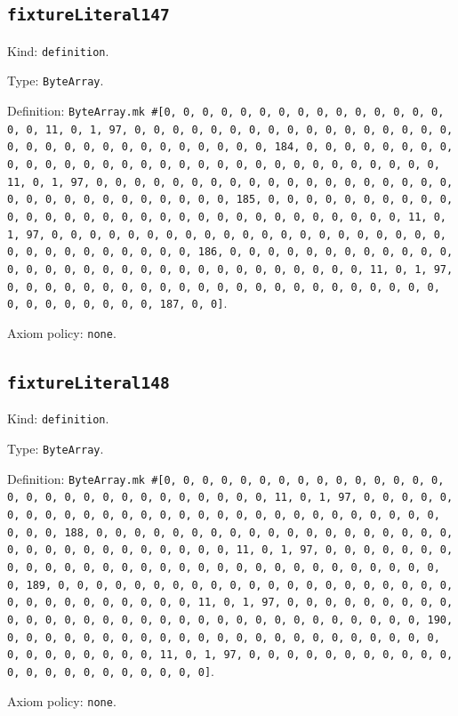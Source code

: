 \documentclass[11pt]{article}
\begin{document}
\subsection*{\texttt{fixtureLiteral147}}
\noindent Kind: \texttt{definition}.\par
\noindent Type: \texttt{ByteArray}.\par
\noindent Definition: \texttt{ByteArray.mk \#[0, 0, 0, 0, 0, 0, 0, 0, 0, 0, 0, 0, 0, 0, 0, 0, 0, 11, 0, 1, 97, 0, 0, 0, 0, 0, 0, 0, 0, 0, 0, 0, 0, 0, 0, 0, 0, 0, 0, 0, 0, 0, 0, 0, 0, 0, 0, 0, 0, 0, 0, 0, 184, 0, 0, 0, 0, 0, 0, 0, 0, 0, 0, 0, 0, 0, 0, 0, 0, 0, 0, 0, 0, 0, 0, 0, 0, 0, 0, 0, 0, 0, 0, 0, 11, 0, 1, 97, 0, 0, 0, 0, 0, 0, 0, 0, 0, 0, 0, 0, 0, 0, 0, 0, 0, 0, 0, 0, 0, 0, 0, 0, 0, 0, 0, 0, 0, 0, 0, 185, 0, 0, 0, 0, 0, 0, 0, 0, 0, 0, 0, 0, 0, 0, 0, 0, 0, 0, 0, 0, 0, 0, 0, 0, 0, 0, 0, 0, 0, 0, 0, 11, 0, 1, 97, 0, 0, 0, 0, 0, 0, 0, 0, 0, 0, 0, 0, 0, 0, 0, 0, 0, 0, 0, 0, 0, 0, 0, 0, 0, 0, 0, 0, 0, 0, 0, 186, 0, 0, 0, 0, 0, 0, 0, 0, 0, 0, 0, 0, 0, 0, 0, 0, 0, 0, 0, 0, 0, 0, 0, 0, 0, 0, 0, 0, 0, 0, 0, 11, 0, 1, 97, 0, 0, 0, 0, 0, 0, 0, 0, 0, 0, 0, 0, 0, 0, 0, 0, 0, 0, 0, 0, 0, 0, 0, 0, 0, 0, 0, 0, 0, 0, 0, 187, 0, 0]}.\par
\noindent Axiom policy: \texttt{none}.\par
\subsection*{\texttt{fixtureLiteral148}}
\noindent Kind: \texttt{definition}.\par
\noindent Type: \texttt{ByteArray}.\par
\noindent Definition: \texttt{ByteArray.mk \#[0, 0, 0, 0, 0, 0, 0, 0, 0, 0, 0, 0, 0, 0, 0, 0, 0, 0, 0, 0, 0, 0, 0, 0, 0, 0, 0, 0, 0, 11, 0, 1, 97, 0, 0, 0, 0, 0, 0, 0, 0, 0, 0, 0, 0, 0, 0, 0, 0, 0, 0, 0, 0, 0, 0, 0, 0, 0, 0, 0, 0, 0, 0, 0, 188, 0, 0, 0, 0, 0, 0, 0, 0, 0, 0, 0, 0, 0, 0, 0, 0, 0, 0, 0, 0, 0, 0, 0, 0, 0, 0, 0, 0, 0, 0, 0, 11, 0, 1, 97, 0, 0, 0, 0, 0, 0, 0, 0, 0, 0, 0, 0, 0, 0, 0, 0, 0, 0, 0, 0, 0, 0, 0, 0, 0, 0, 0, 0, 0, 0, 0, 189, 0, 0, 0, 0, 0, 0, 0, 0, 0, 0, 0, 0, 0, 0, 0, 0, 0, 0, 0, 0, 0, 0, 0, 0, 0, 0, 0, 0, 0, 0, 0, 11, 0, 1, 97, 0, 0, 0, 0, 0, 0, 0, 0, 0, 0, 0, 0, 0, 0, 0, 0, 0, 0, 0, 0, 0, 0, 0, 0, 0, 0, 0, 0, 0, 0, 0, 190, 0, 0, 0, 0, 0, 0, 0, 0, 0, 0, 0, 0, 0, 0, 0, 0, 0, 0, 0, 0, 0, 0, 0, 0, 0, 0, 0, 0, 0, 0, 0, 11, 0, 1, 97, 0, 0, 0, 0, 0, 0, 0, 0, 0, 0, 0, 0, 0, 0, 0, 0, 0, 0, 0, 0, 0, 0]}.\par
\noindent Axiom policy: \texttt{none}.\par
\end{document}
